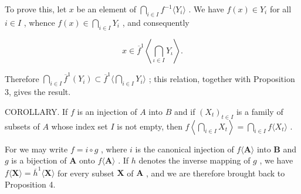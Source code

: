 To prove this, let \(x\) be an element of \(\bigcap_{i \in I} f^{-1} \langle Y_i \rangle\) . We have \(f(x) \in Y_i\) for all \(i \in I\) , whence \(f(x) \in \bigcap_{i \in I} Y_i\) , and consequently

\[
x \in \overline {{f}} ^ {1} \left\langle \bigcap_ {\iota \in I} Y _ {\iota} \right\rangle .
\]

Therefore \(\bigcap_{i\in I}\overline{f}^{1}(Y_{i})\subset\overline{f}^{1}\Big\langle\bigcap_{i\in I}Y_{i}\Big\rangle\) ; this relation, together with Proposition 3, gives the result.

COROLLARY. If \(f\) is an injection of \(A\) into \(B\) and if \((X_{t})_{t \in I}\) is a family of subsets of \(A\) whose index set \(I\) is not empty, then \(f\left\langle \bigcap_{i \in I} X_{t} \right\rangle = \bigcap_{i \in I} f\langle X_{t} \rangle\) .

For we may write \(f = i \circ g\) , where \(i\) is the canonical injection of \(f\langle \mathbf{A} \rangle\) into \(\mathbf{B}\) and \(g\) is a bijection of \(\mathbf{A}\) onto \(f\langle \mathbf{A} \rangle\) . If \(h\) denotes the inverse mapping of \(g\) , we have \(f\langle \mathbf{X} \rangle = \overline{h}^1\langle \mathbf{X} \rangle\) for every subset \(\mathbf{X}\) of \(\mathbf{A}\) , and we are therefore brought back to Proposition 4.

